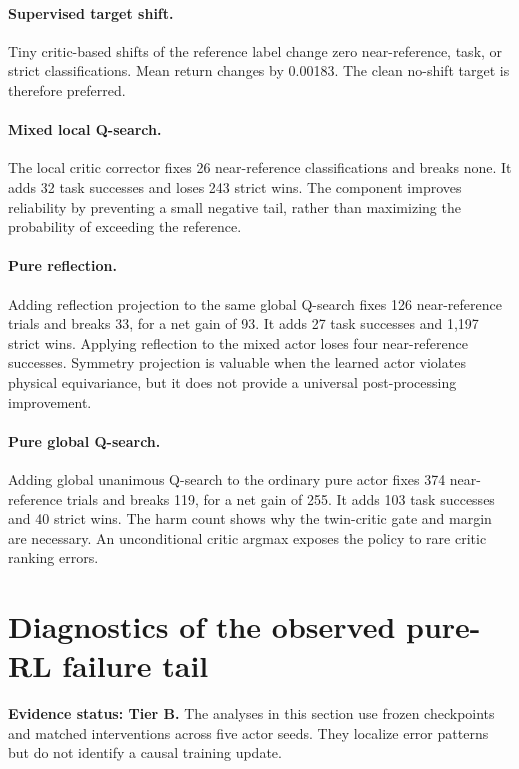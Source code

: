 \documentclass[10pt,twocolumn]{article}
\begin{document}
\paragraph{Supervised target shift.}
Tiny critic-based shifts of the reference label change zero near-reference, task, or strict classifications. Mean return changes by 0.00183. The clean no-shift target is therefore preferred.

\paragraph{Mixed local Q-search.}
The local critic corrector fixes 26 near-reference classifications and breaks none. It adds 32 task successes and loses 243 strict wins. The component improves reliability by preventing a small negative tail, rather than maximizing the probability of exceeding the reference.

\paragraph{Pure reflection.}
Adding reflection projection to the same global Q-search fixes 126 near-reference trials and breaks 33, for a net gain of 93. It adds 27 task successes and 1,197 strict wins. Applying reflection to the mixed actor loses four near-reference successes. Symmetry projection is valuable when the learned actor violates physical equivariance, but it does not provide a universal post-processing improvement.

\paragraph{Pure global Q-search.}
Adding global unanimous Q-search to the ordinary pure actor fixes 374 near-reference trials and breaks 119, for a net gain of 255. It adds 103 task successes and 40 strict wins. The harm count shows why the twin-critic gate and margin are necessary. An unconditional critic argmax exposes the policy to rare critic ranking errors.

\section{Diagnostics of the observed pure-RL failure tail}

\noindent\textbf{Evidence status: Tier B.} The analyses in this section use frozen checkpoints and matched interventions across five actor seeds. They localize error patterns but do not identify a causal training update.
\end{document}
